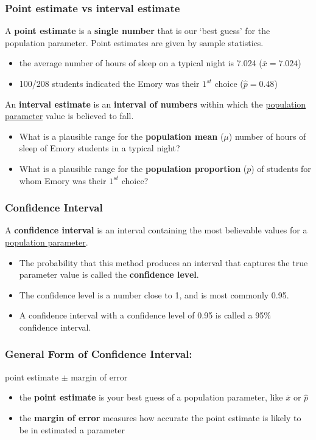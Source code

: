 \begin{frame}
\frametitle{Point estimate vs interval estimate}
A \textbf{point estimate} is a \textbf{single number} that is our `best guess' for the  population parameter.  Point estimates are given by sample statistics.  \\
\begin{itemize}
    \item
    the average number of hours of sleep on a typical night is 7.024 ($\bar{x}=7.024$)
    \item
    100/208 students indicated the Emory was their $1^{st}$ choice ($\hat{p}=0.48$)
\end{itemize}
\vskip10pt
An \textbf{interval estimate} is an \textbf{interval of numbers} within which the \underline{population parameter} value is believed to fall.\\
\begin{itemize}
    \item
    What is a plausible range for the \textbf{population mean} ($\mu$) number of hours of sleep of Emory students in a typical night?
    \item
    What is a plausible range for the \textbf{population proportion} ($p$) of students for whom Emory was their $1^{st}$ choice?
\end{itemize}
\end{frame}

\begin{frame}
\frametitle{Confidence Interval}
A \textbf{confidence interval} is an interval containing the most believable values for a \underline{population parameter}.
\begin{itemize}
    \item
    The probability that this method produces an interval that captures the true parameter value is called the \textbf{confidence level}.
    \item
    The confidence level is a number close to 1, and is most commonly 0.95.
    \item
    A confidence interval with a confidence level of 0.95 is called a 95\% confidence interval.
  \end{itemize}
\end{frame}

\begin{frame}
\frametitle{General Form of  Confidence Interval:}
\begin{center}
    point estimate $\pm$ margin of error
\end{center}
\begin{itemize}
    \item
    the \textbf{point estimate} is your best guess of a population parameter, like $\bar{x}$ or $\hat{p}$
    \item
    the \textbf{margin of error} measures how accurate the point estimate is likely to be in estimated a parameter
\end{itemize}
\end{frame}

